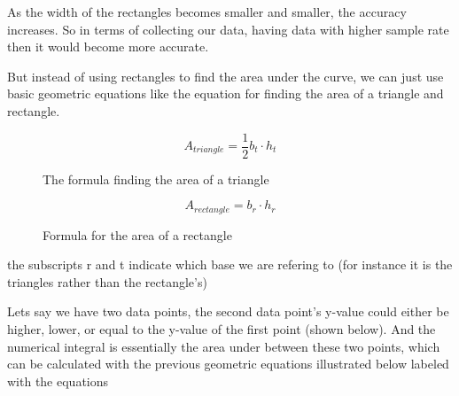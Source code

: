 \documentclass[12pt]{article}
\begin{document}
%

As the width of the rectangles becomes smaller and smaller, the accuracy increases. So in terms of collecting our data, having data with higher sample rate then it would become more accurate. %

But instead of using rectangles to find the area under the curve, we can just use basic geometric equations like the equation for finding the area of a triangle and rectangle. %

\begin{figure}[H]
    \center
    \begin{equation}
        A_{triangle} = \frac{1}{2}b_{t}\cdot h_{t}
    \end{equation}
    \caption{The formula finding the area of a triangle}
\end{figure}
\begin{figure}[H]
    \center
    \begin{equation}
        A_{rectangle} = b_{r}\cdot h_{r}
    \end{equation}
    \caption{Formula for the area of a rectangle}
\end{figure}

the subscripts r and t indicate which base we are refering to (for instance it is the triangles rather than the rectangle's)

Lets say we have two data points, the second data point's y-value could either be higher, lower, or equal to the y-value of the first point (shown below). And the numerical integral is essentially the area under between these two points, which can be calculated with the previous geometric equations illustrated below labeled with the equations
\end{document}
